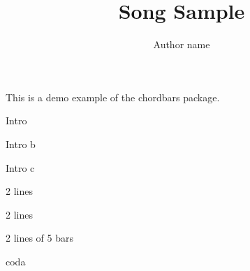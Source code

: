 \documentclass[11pt]{article}
\title{Song Sample}
\author{Author name}
\begin{document}
\bpbthree

\countbarsYes

\songtitle

This is a demo example of the chordbars package.


\begin{chordbar}{4}{1}{Intro}
\repeatchord
\end{chordbar}
\begin{chordbar}{4}{3}{Intro b}
\repeatchord
{}
\end{chordbar}

\begin{chordbar}{4}{1}{Intro c}
\repeatchord
\repeatchord
\end{chordbar}




\begin{chordbarl}{12}{4}{2}{2 lines}
\repeatchord
\repeatchord
\end{chordbarl}

\begin{chordbarl}{11}{4}{3}{2 lines}
\newchordline
{}
\repeatchord
\end{chordbarl}

\begin{chordbarl}{10}{5}{2}{2 lines of 5 bars}
\newchordline
{}
\repeatchord
\end{chordbarl}


\begin{chordbarl}{11}{4}{2}{coda}
\end{chordbarl}


\printNbBars
\end{document}
